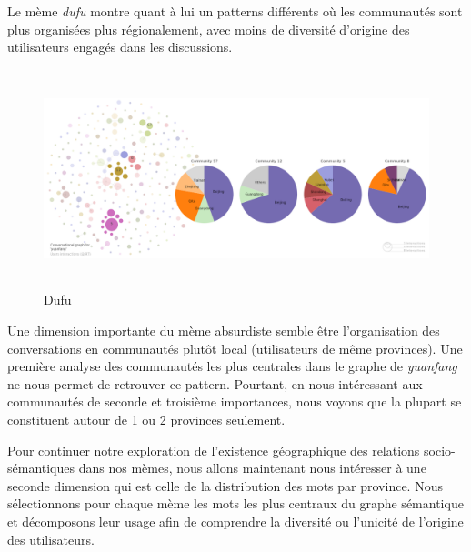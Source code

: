 Le m\`eme \textit{dufu }montre quant \`a lui un patterns diff\'erents
o\`u les communaut\'es sont plus organis\'ees plus r\'egionalement,
avec moins de diversit\'e d{\textquoteright}origine des utilisateurs
engag\'es dans les discussions.


\begin{figure}
    \centering

   \includegraphics[width=5.9996in,height=2.5004in]{figures/chap4/chapitre4-img58.png}
   

    \caption{
        Dufu
    }

\end{figure}


 


Une dimension importante du m\`eme absurdiste semble \^etre
l{\textquoteright}organisation des conversations en communaut\'es
plut\^ot local (utilisateurs de m\^eme provinces). Une premi\`ere
analyse des communaut\'es les plus centrales dans le graphe de
\textit{yuanfang }ne nous permet de retrouver ce pattern. Pourtant, en
nous int\'eressant aux communaut\'es de seconde et troisi\`eme
importances, nous voyons que la plupart se constituent autour de 1 ou 2
provinces seulement. 


Pour continuer notre exploration de l{\textquoteright}existence
g\'eographique des relations socio-s\'emantiques dans nos m\`emes, nous
allons maintenant nous int\'eresser \`a une seconde dimension qui est
celle de la distribution des mots par province. Nous s\'electionnons
pour chaque m\`eme les mots les plus centraux du graphe s\'emantique et
d\'ecomposons leur usage afin de comprendre la diversit\'e ou
l{\textquoteright}unicit\'e de l{\textquoteright}origine des
utilisateurs.


